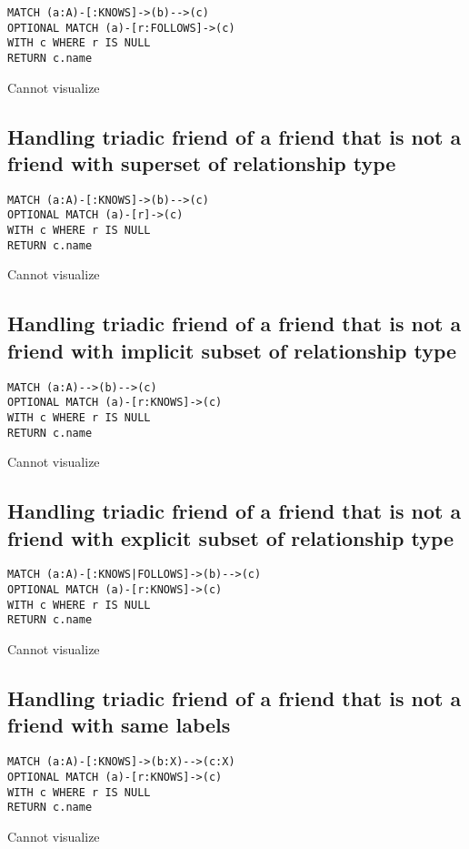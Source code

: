 \begin{lstlisting}
MATCH (a:A)-[:KNOWS]->(b)-->(c)
OPTIONAL MATCH (a)-[r:FOLLOWS]->(c)
WITH c WHERE r IS NULL
RETURN c.name
\end{lstlisting}

Cannot visualize
\subsection{Handling triadic friend of a friend that is not a friend with superset of relationship type}

\begin{lstlisting}
MATCH (a:A)-[:KNOWS]->(b)-->(c)
OPTIONAL MATCH (a)-[r]->(c)
WITH c WHERE r IS NULL
RETURN c.name
\end{lstlisting}

Cannot visualize
\subsection{Handling triadic friend of a friend that is not a friend with implicit subset of relationship type}

\begin{lstlisting}
MATCH (a:A)-->(b)-->(c)
OPTIONAL MATCH (a)-[r:KNOWS]->(c)
WITH c WHERE r IS NULL
RETURN c.name
\end{lstlisting}

Cannot visualize
\subsection{Handling triadic friend of a friend that is not a friend with explicit subset of relationship type}

\begin{lstlisting}
MATCH (a:A)-[:KNOWS|FOLLOWS]->(b)-->(c)
OPTIONAL MATCH (a)-[r:KNOWS]->(c)
WITH c WHERE r IS NULL
RETURN c.name
\end{lstlisting}

Cannot visualize
\subsection{Handling triadic friend of a friend that is not a friend with same labels}

\begin{lstlisting}
MATCH (a:A)-[:KNOWS]->(b:X)-->(c:X)
OPTIONAL MATCH (a)-[r:KNOWS]->(c)
WITH c WHERE r IS NULL
RETURN c.name
\end{lstlisting}

Cannot visualize
